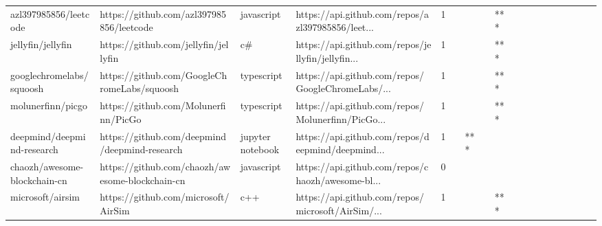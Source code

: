 \begin{tabular}{llllrlllllllllllll}
azl397985856/leetcode                              &           https://github.com/azl397985856/leetcode &        javascript &  https://api.github.com/repos/azl397985856/leet... &       1 &         &        &           &            *** &                 &        &           &           &          &          &       &              &          \\
jellyfin/jellyfin                                  &               https://github.com/jellyfin/jellyfin &                c\# &  https://api.github.com/repos/jellyfin/jellyfin... &       1 &         &        &           &            *** &                 &        &           &           &          &          &       &              &          \\
googlechromelabs/squoosh                           &        https://github.com/GoogleChromeLabs/squoosh &        typescript &  https://api.github.com/repos/GoogleChromeLabs/... &       1 &         &        &           &            *** &                 &        &           &           &          &          &       &              &          \\
molunerfinn/picgo                                  &               https://github.com/Molunerfinn/PicGo &        typescript &  https://api.github.com/repos/Molunerfinn/PicGo... &       1 &         &        &           &            *** &                 &        &           &           &          &          &       &              &          \\
deepmind/deepmind-research                         &      https://github.com/deepmind/deepmind-research &  jupyter notebook &  https://api.github.com/repos/deepmind/deepmind... &       1 &         &    *** &           &                &                 &        &           &           &          &          &       &              &          \\
chaozh/awesome-blockchain-cn                       &    https://github.com/chaozh/awesome-blockchain-cn &        javascript &  https://api.github.com/repos/chaozh/awesome-bl... &       0 &         &        &           &                &                 &        &           &           &          &          &       &              &          \\
microsoft/airsim                                   &                https://github.com/microsoft/AirSim &               c++ &  https://api.github.com/repos/microsoft/AirSim/... &       1 &         &        &           &            *** &                 &        &           &           &          &          &       &              &          \\

\end{tabular}
